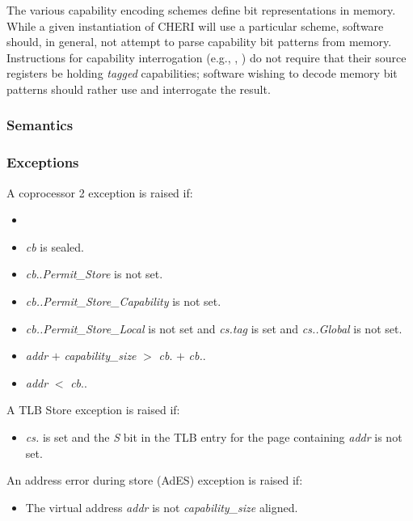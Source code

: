 The various capability encoding schemes define bit representations in
memory.  While a given instantiation of CHERI will use a particular scheme,
software should, in general, not attempt to parse capability bit patterns
from memory.  Instructions for capability interrogation (e.g.,
, ) do not require that their
source registers be holding \emph{tagged} capabilities; software wishing to
decode memory bit patterns should rather use  and
interrogate the result.

\subsubsection*{Semantics}

\subsubsection*{Exceptions}

A coprocessor 2 exception is raised if:

\begin{itemize}
\item
\cchecktag{}
\item
\emph{cb} is sealed.
\item
\emph{cb}.\cperms.\emph{Permit\_Store} is not set.
\item
\emph{cb.\cperms.Permit\_Store\_Capability} is not set.
\item
\emph{cb.\cperms{}.Permit\_Store\_Local} is not set and
\emph{cs.tag} is set and \emph{cs.\cperms{}.Global} is not set.
\item
\emph{addr} $+$ \emph{capability\_size} $>$ \emph{cb}.\cbase{}
$+$ \emph{cb.\clength{}}.
\item
\emph{addr} $<$ \emph{cb}.\cbase{}.
\end{itemize}

\noindent
A TLB Store exception is raised if:

\begin{itemize}
\item
\emph{cs.\ctag{}} is set and the \emph{S} bit in the TLB entry for the page
containing \emph{addr} is not set.
\end{itemize}

\noindent
An address error during store (AdES) exception is raised if:

\begin{itemize}
\item
The virtual address \emph{addr} is not \emph{capability\_size} aligned.
\end{itemize}

